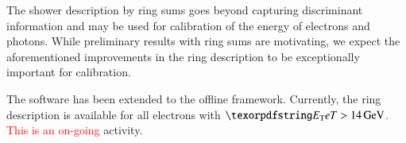 The shower description by ring sums goes beyond capturing discriminant
information and may be used for calibration of the energy of electrons and
photons. While preliminary results with ring sums are motivating, we expect the aforementioned
improvements in the ring description to be exceptionally important for
calibration.

The \rnn{} software has been extended to the offline framework. Currently,
the ring description is available for all electrons with \textcolor{red}{$\et>\SI{14}{\GeV}$.
This is an on-going} activity.

